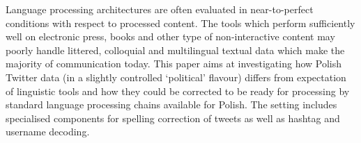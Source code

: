 Language processing architectures are often evaluated in near-to-perfect conditions with respect to processed content. The tools which perform sufficiently well on electronic press, books and other type of non-interactive content may poorly handle littered, colloquial and multilingual textual data which make the majority of communication today. This paper aims at investigating how Polish Twitter data (in a slightly controlled `political' flavour) differs from expectation of linguistic tools and how they could be corrected to be ready for processing by standard language processing chains available for Polish. The setting includes specialised components for spelling correction of tweets as well as hashtag and username decoding.
